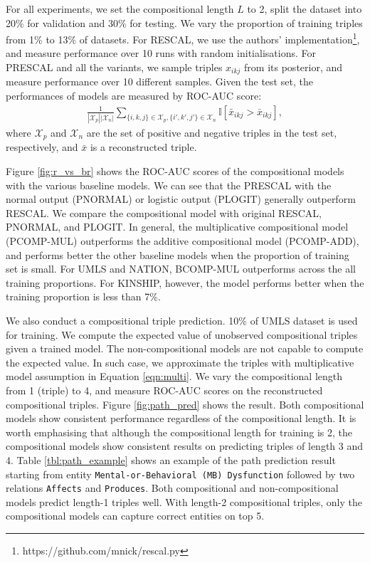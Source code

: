 For all experiments, we set the compositional length $L$ to 2, split the dataset into 20\% for validation and 30\% for testing. We vary the proportion of training triples
from 1\% to 13\% of datasets. For RESCAL, we use the authors' implementation\footnote{https://github.com/mnick/rescal.py}, and measure performance over 10 runs with random initialisations. For PRESCAL and all the variants, we sample triples $x_{ikj}$ from its posterior, and measure performance over 10 different samples.
Given the test set, the performances of models are measured by ROC-AUC score:
\begin{align}
\frac{1}{|\mathcal{X}_p|  |\mathcal{X}_n|} \sum_{\{i,k,j\} \in \mathcal{X}_p, \{i',k',j'\} \in \mathcal{X}_n} \mathbb{I}[\bar{x}_{ikj} > \bar{x}_{ikj}],
\end{align}
where $\mathcal{X}_p$ and $\mathcal{X}_n$ are the set of positive and negative triples in the test set, respectively, and $\bar{x}$ is a reconstructed triple.

Figure \ref{fig:r_vs_br} shows the ROC-AUC scores of the compositional models 
with the various baseline models. We can see that the PRESCAL with 
the normal output (PNORMAL) or logistic output (PLOGIT) generally outperform RESCAL. 
We compare the compositional model with original RESCAL, PNORMAL, and PLOGIT. 
In general, the multiplicative compositional model (PCOMP-MUL) outperforms 
the additive compositional model (PCOMP-ADD), and performs better the other baseline models 
when the proportion of training set is small. For UMLS and NATION, BCOMP-MUL outperforms 
across the all training proportions. 
For KINSHIP, however, the model performs better when the training proportion is less than 7\%.

We also conduct a compositional triple prediction. 
10\% of UMLS dataset is used for training. 
We compute the expected value of unobserved compositional triples given a trained model. 
The non-compositional models are not capable to compute the expected value. 
In such case, we approximate the triples with multiplicative model assumption in Equation \ref{eqn:multi}. 
We vary the compositional length from 1 (triple) to 4, and measure ROC-AUC scores on the reconstructed compositional triples. 
Figure \ref{fig:path_pred} shows the result. 
Both compositional models show consistent performance regardless of the compositional length. 
It is worth emphasising that although the compositional length for training is 2, 
the compositional models show consistent results on predicting triples of length 3 and 4. 
Table \ref{tbl:path_example} shows an example of the path prediction result 
starting from entity \texttt{Mental-or-Behavioral (MB) Dysfunction} followed by two relations \texttt{Affects} and \texttt{Produces}. 
Both compositional and non-compositional models predict length-1 triples well. 
With length-2 compositional triples, only the compositional models can capture correct entities on top 5.

